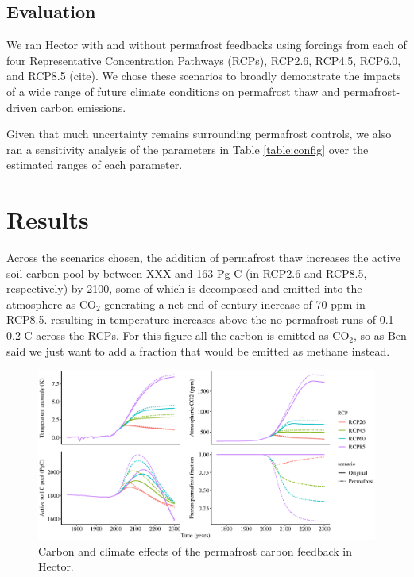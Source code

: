 \documentclass[essd, manuscript]{copernicus}
\begin{document}

\subsection{Evaluation}
We ran Hector with and without permafrost feedbacks using forcings from each of four Representative Concentration Pathways (RCPs), RCP2.6, RCP4.5, RCP6.0, and RCP8.5 (cite). We chose these scenarios to broadly demonstrate the impacts of a wide range of future climate conditions on permafrost thaw and permafrost-driven carbon emissions. 

Given that much uncertainty remains surrounding permafrost controls, we also ran a sensitivity analysis of the parameters in Table \ref{table:config} over the estimated ranges of each parameter.

\section{Results}

Across the scenarios chosen, the addition of permafrost thaw increases the active soil carbon pool by between XXX and 163 Pg C (in RCP2.6 and RCP8.5, respectively) by 2100, some of which is decomposed and emitted into the atmosphere as CO$_2$ generating a net end-of-century increase of 70 ppm in RCP8.5. resulting in temperature increases above the no-permafrost runs of 0.1-0.2 \degree C across the RCPs. For this figure all the carbon is emitted as CO$_2$, so as Ben said we just want to add a fraction that would be emitted as methane instead.

\begin{figure}
    \centering
    \includegraphics[width=\textwidth]{figures/hector_4panel_results.eps}
    \caption{Carbon and climate effects of the permafrost carbon feedback in Hector.}
    \label{fig:results}
\end{figure}
\end{document}
